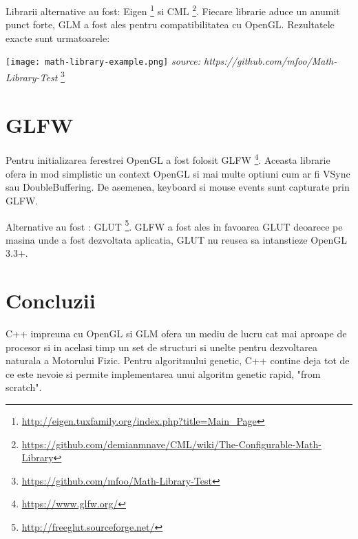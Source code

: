 Librarii alternative au fost: Eigen \footnote{\url{http://eigen.tuxfamily.org/index.php?title=Main_Page}} si CML \footnote{\url{https://github.com/demianmnave/CML/wiki/The-Configurable-Math-Library}}. Fiecare librarie aduce un anumit punct forte, GLM a fost ales pentru compatibilitatea cu OpenGL. Rezultatele exacte sunt urmatoarele:

\begin{center}
    \texttt{[image: math-library-example.png]} \textit{source: https://github.com/mfoo/Math-Library-Test} \footnote{\url{https://github.com/mfoo/Math-Library-Test}}
\end{center}




\section{GLFW}
 
Pentru initializarea ferestrei OpenGL a fost folosit GLFW \footnote{\url{https://www.glfw.org/}}. Aceasta librarie ofera in mod simplistic un context OpenGL si mai multe optiuni cum ar fi VSync sau DoubleBuffering. De asemenea,
keyboard si mouse events sunt capturate prin GLFW.

Alternative au fost : GLUT \footnote{\url{http://freeglut.sourceforge.net/}}. GLFW a fost ales in favoarea GLUT deoarece pe masina unde a fost dezvoltata aplicatia, GLUT nu reusea sa intanstieze OpenGL 3.3+.
\section{Concluzii}

C++ impreuna cu OpenGL si GLM ofera un mediu de lucru cat mai aproape de procesor si in acelasi timp un set de structuri si unelte pentru dezvoltarea naturala a Motorului Fizic. Pentru algoritmului genetic, C++ contine deja tot de ce este nevoie si permite implementarea unui algoritm genetic rapid, "from scratch".
